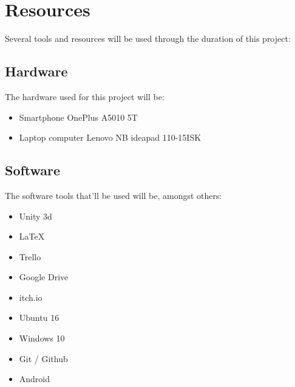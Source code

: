 \section{Resources}

Several tools and resources will be used through the duration of this project:

\subsection{Hardware}

The hardware used for this project will be:

\begin{itemize}
    \item Smartphone OnePlus A5010 5T 
    \item Laptop computer Lenovo NB ideapad 110-15ISK
\end{itemize}

\subsection{Software}

The software tools that'll be used will be, amongst others:

\begin{itemize}
    \item Unity 3d
    \item LaTeX
    \item Trello
    \item Google Drive
    \item itch.io
    \item Ubuntu 16
    \item Windows 10
    \item Git / Github
    \item Android
\end{itemize}

